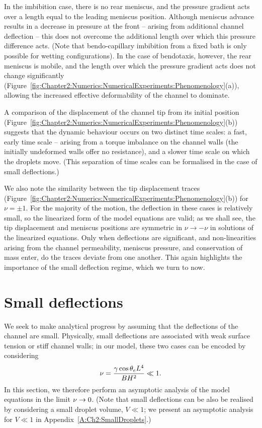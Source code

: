 In the imbibition case, there is no rear meniscus, and the pressure gradient acts over a length equal to the leading meniscus position. Although meniscus advance results in a decrease in pressure at the front -- arising from additional channel deflection -- this does not overcome the additional length over which this pressure difference acts. (Note that bendo-capillary imbibition from a fixed bath is only possible for wetting configurations). In the case of bendotaxis, however, the rear meniscus is mobile, and the length over which the pressure gradient acts does not change significantly (Figure~\ref{fig:Chapter2:Numerics:NumericalExperiments:Phenomenology}(a)), allowing the increased effective deformability of the channel to dominate.

A comparison of the displacement of the channel tip from its initial position (Figure~\ref{fig:Chapter2:Numerics:NumericalExperiments:Phenomenology}(b)) suggests that the dynamic behaviour occurs on two distinct time scales: a fast, early time scale -- arising from a torque imbalance on the channel walls (the initially undeformed walls offer no resistance), and a slower time scale on which the droplets move. (This separation of time scales can be formalised in the case of small deflections.)

We also note the similarity between the tip displacement traces (Figure~\ref{fig:Chapter2:Numerics:NumericalExperiments:Phenomenology}(b)) for $\nu = \pm1$. For the majority of the motion, the deflection in these cases is relatively small, so the linearized form of the model equations are valid; as we shall see, the tip displacement and meniscus positions are symmetric in $\nu \to -\nu$ in solutions of the linearized equations. Only when deflections are significant, and non-linearities arising from the channel permeability, meniscus pressure, and conservation of mass enter, do the traces deviate from one another.  This again highlights the importance of the small deflection regime, which we turn to now.

\section{Small deflections}\label{S:Ch2:SmallDeformations}
We seek to make analytical progress by assuming that the deflections of the channel are small. Physically, small deflections are associated with weak surface tension or stiff channel walls; in our model, these two cases can be encoded by considering
\begin{equation}\label{E:Chapter2:SmallDef:Limit}
\nu = \frac{\gamma \cos \theta_e L^4 }{B H^2} \ll 1.
\end{equation}
In this section, we therefore perform an asymptotic analysis of the model equations in the limit $\nu \to 0$. (Note that small deflections can be also be realised by considering a small droplet volume, $V \ll 1$; we present an asymptotic analysis for $V \ll 1$  in Appendix~\ref{A:Ch2:SmallDroplets}.)

